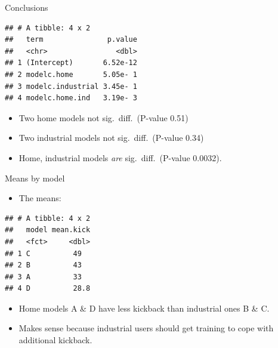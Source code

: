 \documentclass[ignorenonframetext,]{beamer}
\newenvironment{Shaded}{\begin{snugshade}}{\end{snugshade}}
\newcommand{\DataTypeTok}[1]{\textcolor[rgb]{0.13,0.29,0.53}{#1}}
\newcommand{\FloatTok}[1]{\textcolor[rgb]{0.00,0.00,0.81}{#1}}
\newcommand{\KeywordTok}[1]{\textcolor[rgb]{0.13,0.29,0.53}{\textbf{#1}}}
\newcommand{\NormalTok}[1]{#1}
\newcommand{\OperatorTok}[1]{\textcolor[rgb]{0.81,0.36,0.00}{\textbf{#1}}}
\newcommand{\StringTok}[1]{\textcolor[rgb]{0.31,0.60,0.02}{#1}}
\providecommand{\tightlist}{%
  \setlength{\itemsep}{0pt}\setlength{\parskip}{0pt}}
\begin{document}
\begin{frame}[fragile]{Conclusions}
\protect\hypertarget{conclusions-2}{}

\begin{Shaded}
\end{Shaded}

\begin{verbatim}
## # A tibble: 4 x 2
##   term               p.value
##   <chr>                <dbl>
## 1 (Intercept)       6.52e-12
## 2 modelc.home       5.05e- 1
## 3 modelc.industrial 3.45e- 1
## 4 modelc.home.ind   3.19e- 3
\end{verbatim}

\begin{itemize}
\item
  Two home models not sig.~diff.~(P-value 0.51)
\item
  Two industrial models not sig.~diff.~(P-value 0.34)
\item
  Home, industrial models \emph{are} sig.~diff.~(P-value 0.0032).
\end{itemize}

\end{frame}

\begin{frame}[fragile]{Means by model}
\protect\hypertarget{means-by-model}{}

\begin{itemize}
\tightlist
\item
  The means:
\end{itemize}

\footnotesize

\begin{Shaded}
\end{Shaded}

\begin{verbatim}
## # A tibble: 4 x 2
##   model mean.kick
##   <fct>     <dbl>
## 1 C          49  
## 2 B          43  
## 3 A          33  
## 4 D          28.8
\end{verbatim}

\normalsize

\begin{itemize}
\item
  Home models A \& D have less kickback than industrial ones B \& C.
\item
  Makes sense because industrial users should get training to cope with
  additional kickback.
\end{itemize}

\end{frame}
\end{document}
